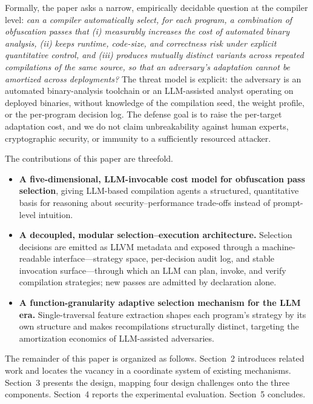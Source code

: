 \documentclass[5p,times,authoryear]{elsarticle}
\theoremstyle{plain}
\theoremstyle{definition}
\theoremstyle{remark}
\begin{document}
Formally, the paper asks a narrow, empirically decidable question at the
compiler level: \emph{can a compiler automatically select, for each program, a
combination of obfuscation passes that (i) measurably increases the cost of
automated binary analysis, (ii) keeps runtime, code-size, and correctness risk
under explicit quantitative control, and (iii) produces mutually distinct
variants across repeated compilations of the same source, so that an
adversary's adaptation cannot be amortized across deployments?} The threat
model is explicit: the adversary is an automated binary-analysis toolchain or
an LLM-assisted analyst operating on deployed binaries, without knowledge of
the compilation seed, the weight profile, or the per-program decision log. The
defense goal is
to raise the per-target adaptation cost, and we do not claim unbreakability
against human experts, cryptographic security, or immunity to a sufficiently
resourced attacker.

The contributions of this paper are threefold.
\begin{itemize}
\item \textbf{A five-dimensional, LLM-invocable cost model for obfuscation pass
  selection}, giving LLM-based compilation agents a structured, quantitative basis
  for reasoning about security--performance trade-offs instead of prompt-level
  intuition.
\item \textbf{A decoupled, modular selection--execution architecture.} Selection
  decisions are emitted as LLVM metadata and exposed through a machine-readable
  interface---strategy space, per-decision audit log, and stable invocation
  surface---through which an LLM can plan, invoke, and verify compilation
  strategies; new passes are admitted by declaration alone.
\item \textbf{A function-granularity adaptive selection mechanism for the LLM
  era.} Single-traversal feature extraction shapes each program's strategy by its
  own structure and makes recompilations structurally distinct, targeting the
  amortization economics of LLM-assisted adversaries.
\end{itemize}

The remainder of this paper is organized as follows. Section~2 introduces
related work and locates the vacancy in a coordinate system of existing
mechanisms. Section~3 presents the design, mapping four design challenges
onto the three components. Section~4 reports the experimental evaluation.
Section~5 concludes.

\end{document}
